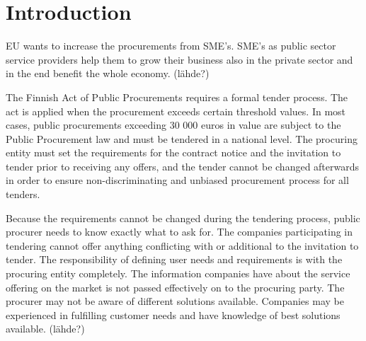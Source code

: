 \documentclass[12pt,a4paper,oneside,pdftex]{report}
\begin{document}

\label{pages-prelude}
\cleardoublepage

\startfirstchapter

\pagestyle{headings}


% 

\chapter{Introduction}
\label{chapter:intro}
\label{Background}

EU wants to increase the procurements from SME’s. SME’s as public sector service providers help them to grow their business also in the private sector and in the end benefit the whole economy. (lähde?)

The Finnish Act of Public Procurements requires a formal tender process. The  act  is  applied  when  the  procurement  exceeds  certain  threshold  values. In most cases, public procurements exceeding 30 000 euros in value are subject to the Public Procurement law and must be tendered in a national level. The procuring entity must set the requirements for the contract notice and the invitation to tender prior to receiving any offers, and the tender cannot be changed afterwards in order to ensure non-discriminating and unbiased procurement process for all tenders. ~\citep{Hankintaopas}

Because the requirements cannot be changed during the tendering process, public procurer needs to know exactly what to ask for. The companies participating in tendering cannot offer anything conflicting with or additional to the invitation to tender. The responsibility of defining user needs and requirements is with the procuring entity completely. The information companies have about the service offering on the market is not passed effectively on to the procuring party. The procurer may not be aware of different solutions available. Companies may be experienced in fulfilling customer needs and have knowledge of best solutions available. (lähde?)
\end{document}
